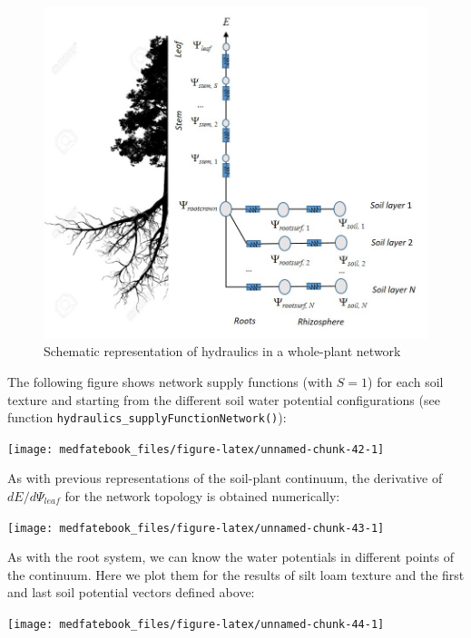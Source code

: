 \documentclass[]{book}
\begin{document}
\begin{figure}

{\centering \includegraphics[width=0.8\linewidth]{hydraulics_nocap} 

}

\caption{Schematic representation of hydraulics in a whole-plant network}\label{fig:unnamed-chunk-41}
\end{figure}

The following figure shows network supply functions (with \(S = 1\)) for
each soil texture and starting from the different soil water potential
configurations (see function
\texttt{hydraulics\_supplyFunctionNetwork()}):

\begin{center}\texttt{[image: medfatebook\_files/figure-latex/unnamed-chunk-42-1]} \end{center}

As with previous representations of the soil-plant continuum, the
derivative of \(dE/d\Psi_{leaf}\) for the network topology is obtained
numerically:

\begin{center}\texttt{[image: medfatebook\_files/figure-latex/unnamed-chunk-43-1]} \end{center}

As with the root system, we can know the water potentials in different
points of the continuum. Here we plot them for the results of silt loam
texture and the first and last soil potential vectors defined above:

\begin{center}\texttt{[image: medfatebook\_files/figure-latex/unnamed-chunk-44-1]} \end{center}
\end{document}
